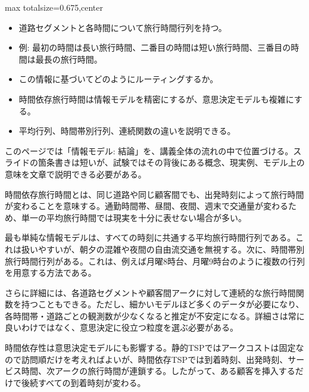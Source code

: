 \clearpage
{}
\begin{adjustbox}{max totalsize={\textwidth}{0.675\textheight},center}
\begin{minipage}{\textwidth}\scriptsize
\begin{minipage}[t]{0.485\textwidth}
\begin{itemize}
\item 道路セグメントと各時間について旅行時間行列を持つ。
\item 例: 最初の時間は長い旅行時間、二番目の時間は短い旅行時間、三番目の時間は最長の旅行時間。
\item この情報に基づいてどのようにルーティングするか。
\end{itemize}
\begin{itemize}
\item 時間依存旅行時間は情報モデルを精密にするが、意思決定モデルも複雑にする。
\item 平均行列、時間帯別行列、連続関数の違いを説明できる。
\end{itemize}
\end{minipage}\hfill
\begin{minipage}[t]{0.485\textwidth}
このページでは「情報モデル: 結論」を、講義全体の流れの中で位置づける。スライドの箇条書きは短いが、試験ではその背後にある概念、現実例、モデル上の意味を文章で説明できる必要がある。\par
時間依存旅行時間とは、同じ道路や同じ顧客間でも、出発時刻によって旅行時間が変わることを意味する。通勤時間帯、昼間、夜間、週末で交通量が変わるため、単一の平均旅行時間では現実を十分に表せない場合が多い。\par
最も単純な情報モデルは、すべての時刻に共通する平均旅行時間行列である。これは扱いやすいが、朝夕の混雑や夜間の自由流交通を無視する。次に、時間帯別旅行時間行列がある。これは、例えば月曜8時台、月曜9時台のように複数の行列を用意する方法である。\par
さらに詳細には、各道路セグメントや顧客間アークに対して連続的な旅行時間関数を持つこともできる。ただし、細かいモデルほど多くのデータが必要になり、各時間帯・道路ごとの観測数が少なくなると推定が不安定になる。詳細さは常に良いわけではなく、意思決定に役立つ粒度を選ぶ必要がある。\par
時間依存性は意思決定モデルにも影響する。静的TSPではアークコストは固定なので訪問順だけを考えればよいが、時間依存TSPでは到着時刻、出発時刻、サービス時間、次アークの旅行時間が連鎖する。したがって、ある顧客を挿入するだけで後続すべての到着時刻が変わる。\par

\end{minipage}
\end{minipage}
\end{adjustbox}
